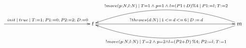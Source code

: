 $\xymatrix{
   \ar[rrrrr]^{init\:|\:true\:|\:T:=1;\:P1:=0;\:P2:=2;\:D:=0} &&&&& {t} \ar[rrrrrrrr]^{?throws(d:N)\,|\,1\,<=\,d\,<=\,6\,|\,D\,:=\,d} &&&&&&&& {m} \ar@/_2pc/[llllllll]_{!move(p:N,l:N)\: |\: T=1 \:\land\: p=1 \:\land\: l = (P1+D)\%4\:|\:P1:=l;\:T:=2} \ar@/^2pc/[llllllll]^{!move(p:N,l:N) \:|\: T=2 \:\land\: p=2 \land l = (P2+D)\,\%4;\: P2:=l;\:T:=1}
}$
